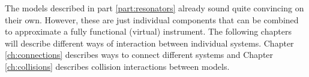 The models described in part \ref{part:resonators} already sound quite convincing on their own. However, these are just individual components that can be combined to approximate a fully functional (virtual) instrument. The following chapters will describe different ways of interaction between individual systems. Chapter \ref{ch:connections} describes ways to connect different systems and Chapter \ref{ch:collisions} describes collision interactions between models. 